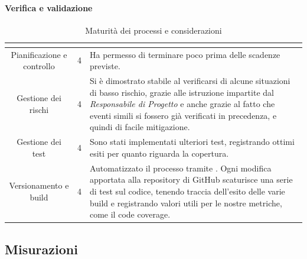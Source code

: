\paragraph{Verifica e validazione} \Spazio
\renewcommand{\arraystretch}{1.5}
\begin{table}[H]
	\begin{center}
		\begin{tabular}{|c|c|p{6.8cm}|}
			\hline
			\rowcolor{title_row}
			\textbf{\color{title_text}{Processo}} & \textbf{\color{title_text}{Livello di maturità}} & \textbf{\color{title_text}{Considerazioni}} \\
			\hline
			{Pianificazione e controllo} & {4} & {Ha permesso di terminare poco prima delle scadenze previste.}\\	
			\hline
			{Gestione dei rischi} & {4} & {Si è dimostrato stabile al verificarsi di alcune situazioni di basso rischio, grazie alle istruzione impartite dal \emph{Responsabile di Progetto} e anche grazie al fatto che eventi simili si fossero già verificati in precedenza, e quindi di facile mitigazione.}\\	
			\hline
			{Gestione dei test} & {4} & {Sono stati implementati ulteriori test, registrando ottimi esiti per quanto riguarda la copertura.}\\	
			\hline
			{Versionamento e build} & {4} & {Automatizzato il processo tramite \gl{Travis}.} Ogni modifica apportata alla repository di GitHub scaturisce una serie di test sul codice, tenendo traccia dell'esito delle varie build e registrando valori utili per le nostre metriche, come il code coverage.\\	
			\hline
		\end{tabular}
		\caption[Maturità dei processi, Verifica e validazione]{Maturità dei processi e considerazioni}	
		\label{tabella: considerazioni sulla maturità dei processi raggiunta ra}
	\end{center}
\end{table}
\newpage

\subsection{Misurazioni}

